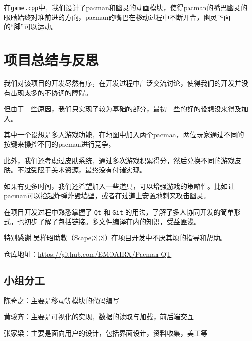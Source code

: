 \documentclass[UTF8,11pt]{ctexart}
\begin{document}
        在\verb|game.cpp|中，我们设计了pacman和幽灵的动画模块，使得pacman的嘴巴幽灵的眼睛始终对准前进的方向，pacman的嘴巴在移动过程中不断开合，幽灵下面的“脚”可以运动。

    \section{项目总结与反思}

    我们对该项目的开发尽然有序，在开发过程中广泛交流讨论，使得我们的开发并没有出现太多的不协调的障碍。

    但由于一些原因，我们只实现了较为基础的部分，最初一些的好的设想没来得及加入。

    其中一个设想是多人游戏功能，在地图中加入两个pacman，两位玩家通过不同的按键来操控不同的pacman进行竞争。

    此外，我们还考虑过皮肤系统，通过多次游戏积累得分，然后兑换不同的游戏皮肤。不过受限于美术资源，最终没有付诸实现。
    
    如果有更多时间，我们还希望加入一些道具，可以增强游戏的策略性。比如让pacman可以捡起炸弹炸毁墙壁，或者在过道上安置地刺来攻击幽灵。

    在项目开发过程中熟悉掌握了 \verb|Qt| 和 \verb|Git| 的用法，了解了多人协同开发的简单形式，也初步了解了包括链接。多文件编译在内的知识，受益匪浅。

    特别感谢 吴槿昭助教（Scape哥哥）在项目开发中不厌其烦的指导和帮助。

    仓库地址：\url{https://github.com/EMOAIRX/Pacman-QT}

    \subsection{小组分工}
    
    陈奇之：主要是移动等模块的代码编写

    黄骏齐：主要是可视化的实现，数据的读取与加载，前后端交互

    张家梁：主要是面向用户的设计，包括界面设计，资料收集，美工等
\end{document}
